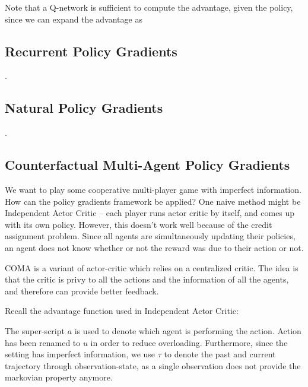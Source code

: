 \documentclass[12pt]{article}
\begin{document}

Note that a Q-network is sufficient to compute the advantage, given the policy, since we can expand the advantage as


\subsection{Recurrent Policy Gradients}
.
\subsection{Natural Policy Gradients}
.
\subsection{Counterfactual Multi-Agent Policy Gradients}

We want to play some cooperative multi-player game with imperfect information. How can the policy gradients framework be applied? One naive method might be Independent Actor Critic -- each player runs actor critic by itself, and comes up with its own policy. However, this doesn't work well because of the credit assignment problem. Since all agents are simultaneously updating their policies, an agent does not know whether or not the reward was due to their action or not.

COMA is a variant of actor-critic which relies on a centralized critic. The idea is that the critic is privy to all the actions and the information of all the agents, and therefore can provide better feedback. 

Recall the advantage function used in Independent Actor Critic:


The super-script $a$ is used to denote which agent is performing the action. Action has been renamed to $u$ in order to reduce overloading. Furthermore, since the setting has imperfect information, we use $\tau$ to denote the past and current trajectory through observation-state, as a single observation does not provide the markovian property anymore.
\end{document}
